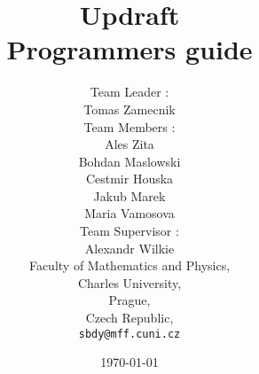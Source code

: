 \documentclass[12pt,a4paper]{refart}
\begin{document}


\title{Updraft \\ Programmers guide}
 \author{Team Leader : \\
	Tomas Zamecnik \\
	Team Members : \\
	Ales Zita \\
	Bohdan Maslowski \\
	Cestmir Houska \\
	Jakub Marek \\
	Maria Vamosova \\
	Team Supervisor :\\
	Alexandr Wilkie\\
   Faculty of Mathematics and Physics,\\
   Charles University,\\
   Prague,\\
   Czech Republic,\\
   \texttt{sbdy@mff.cuni.cz}}
 \date{\today}

\maketitle



\clearpage
 
\pagestyle{headings}


\setcounter{secnumdepth}{1}
\setcounter{tocdepth}{2}
\tableofcontents
\end{document}

